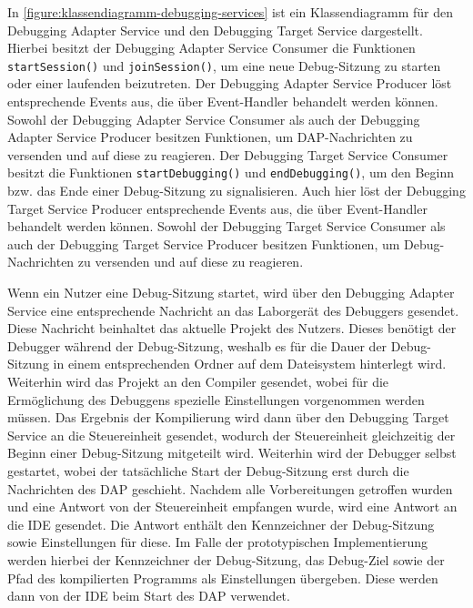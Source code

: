 In \autoref{figure:klassendiagramm-debugging-services} ist ein Klassendiagramm für den Debugging Adapter Service und den Debugging Target Service dargestellt. Hierbei besitzt der Debugging Adapter Service Consumer die Funktionen \texttt{startSession()} und \texttt{joinSession()}, um eine neue Debug-Sitzung zu starten oder einer laufenden beizutreten. Der Debugging Adapter Service Producer löst entsprechende Events aus, die über Event-Handler behandelt werden können. Sowohl der Debugging Adapter Service Consumer als auch der Debugging Adapter Service Producer besitzen Funktionen, um DAP-Nachrichten zu versenden und auf diese zu reagieren. Der Debugging Target Service Consumer besitzt die Funktionen \texttt{startDebugging()} und \texttt{endDebugging()}, um den Beginn bzw. das Ende einer Debug-Sitzung zu signalisieren. Auch hier löst der Debugging Target Service Producer entsprechende Events aus, die über Event-Handler behandelt werden können. Sowohl der Debugging Target Service Consumer als auch der Debugging Target Service Producer besitzen Funktionen, um Debug-Nachrichten zu versenden und auf diese zu reagieren.

Wenn ein Nutzer eine Debug-Sitzung startet, wird über den Debugging Adapter Service eine entsprechende Nachricht an das Laborgerät des Debuggers gesendet. Diese Nachricht beinhaltet das aktuelle Projekt des Nutzers. Dieses benötigt der Debugger während der Debug-Sitzung, weshalb es für die Dauer der Debug-Sitzung in einem entsprechenden Ordner auf dem Dateisystem hinterlegt wird. Weiterhin wird das Projekt an den Compiler gesendet, wobei für die Ermöglichung des Debuggens spezielle Einstellungen vorgenommen werden müssen. Das Ergebnis der Kompilierung wird dann über den Debugging Target Service an die Steuereinheit gesendet, wodurch der Steuereinheit gleichzeitig der Beginn einer Debug-Sitzung mitgeteilt wird. Weiterhin wird der Debugger selbst gestartet, wobei der tatsächliche Start der Debug-Sitzung erst durch die Nachrichten des \ac{DAP} geschieht. Nachdem alle Vorbereitungen getroffen wurden und eine Antwort von der Steuereinheit empfangen wurde, wird eine Antwort an die IDE gesendet. Die Antwort enthält den Kennzeichner der Debug-Sitzung sowie Einstellungen für diese. Im Falle der prototypischen Implementierung werden hierbei der Kennzeichner der Debug-Sitzung, das Debug-Ziel sowie der Pfad des kompilierten Programms als Einstellungen übergeben. Diese werden dann von der IDE beim Start des \ac{DAP} verwendet.

